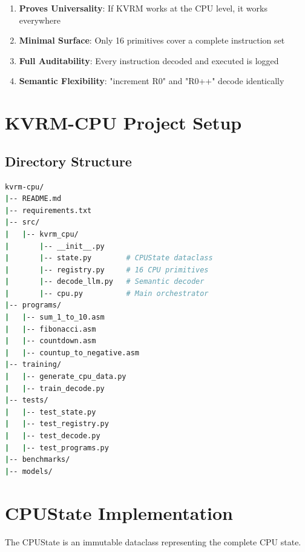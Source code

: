 \documentclass[11pt,a4paper]{article}
\begin{document}
\begin{enumerate}
    \item \textbf{Proves Universality}: If KVRM works at the CPU level, it works everywhere
    \item \textbf{Minimal Surface}: Only 16 primitives cover a complete instruction set
    \item \textbf{Full Auditability}: Every instruction decoded and executed is logged
    \item \textbf{Semantic Flexibility}: "increment R0" and "R0++" decode identically
\end{enumerate}

\section{KVRM-CPU Project Setup}

\subsection{Directory Structure}

\begin{lstlisting}[language=bash, caption={KVRM-CPU Project Structure}]
kvrm-cpu/
|-- README.md
|-- requirements.txt
|-- src/
|   |-- kvrm_cpu/
|       |-- __init__.py
|       |-- state.py        # CPUState dataclass
|       |-- registry.py     # 16 CPU primitives
|       |-- decode_llm.py   # Semantic decoder
|       |-- cpu.py          # Main orchestrator
|-- programs/
|   |-- sum_1_to_10.asm
|   |-- fibonacci.asm
|   |-- countdown.asm
|   |-- countup_to_negative.asm
|-- training/
|   |-- generate_cpu_data.py
|   |-- train_decode.py
|-- tests/
|   |-- test_state.py
|   |-- test_registry.py
|   |-- test_decode.py
|   |-- test_programs.py
|-- benchmarks/
|-- models/
\end{lstlisting}

\section{CPUState Implementation}

The CPUState is an immutable dataclass representing the complete CPU state.
\end{document}
